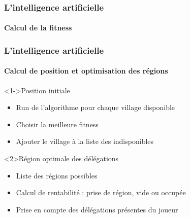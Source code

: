 \begin{frame}
	\frametitle{L'intelligence artificielle}
	\framesubtitle{Calcul de la fitness}
	
\end{frame}

\begin{frame}
	\frametitle{L'intelligence artificielle}
	\framesubtitle{Calcul de position et optimisation des régions}
	
	\begin{block}<1->{Position initiale}
		\begin{itemize}
			\item Run de l'algorithme pour chaque village disponible
			\item Choisir la meilleure fitness
			\item Ajouter le village à la liste des indisponibles
		\end{itemize}
	\end{block}	
	
	\begin{exampleblock}{Région optimale des délégations}
		\begin{itemize}
			\item Liste des régions possibles
			\item Calcul de rentabilité : prise de région, vide ou occupée
			\item Prise en compte des délégations présentes du joueur
		\end{itemize}
	\end{exampleblock}	
\end{frame}